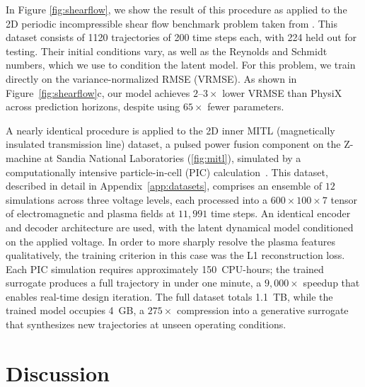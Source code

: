 \documentclass[12pt]{article}
\begin{document}
In Figure \ref{fig:shearflow}, we show the result of this procedure as applied to the 2D periodic incompressible shear flow benchmark problem taken from  \cite{ohana2024well}. This dataset consists of 1120 trajectories of 200 time steps each, with 224 held out for testing. Their initial conditions vary, as well as the Reynolds and Schmidt numbers, which we use to condition the latent model. For this problem, we train directly on the variance-normalized RMSE (VRMSE). As shown in Figure~\ref{fig:shearflow}c, our model achieves $2$--$3\times$ lower VRMSE than PhysiX across prediction horizons, despite using $65\times$ fewer parameters.

A nearly identical procedure is applied to the 2D inner MITL (magnetically insulated transmission line) dataset, a pulsed power fusion component on the Z-machine at Sandia National Laboratories (\ref{fig:mitl}), simulated by a computationally intensive particle-in-cell (PIC) calculation~\cite{bettencourt2021empire}. This dataset, described in detail in Appendix~\ref{app:datasets}, comprises an ensemble of $12$ simulations across three voltage levels, each processed into a $600 \times 100 \times 7$ tensor of electromagnetic and plasma fields at $11{,}991$ time steps. An identical encoder and decoder architecture are used, with the latent dynamical model conditioned on the applied voltage. In order to more sharply resolve the plasma features qualitatively, the training criterion in this case was the L1 reconstruction loss. Each PIC simulation requires approximately 150~CPU-hours; the trained surrogate produces a full trajectory in under one minute, a $9{,}000\times$ speedup that enables real-time design iteration. The full dataset totals 1.1~TB, while the trained model occupies 4~GB, a $275\times$ compression into a generative surrogate that synthesizes new trajectories at unseen operating conditions.


\section{Discussion}
\end{document}
